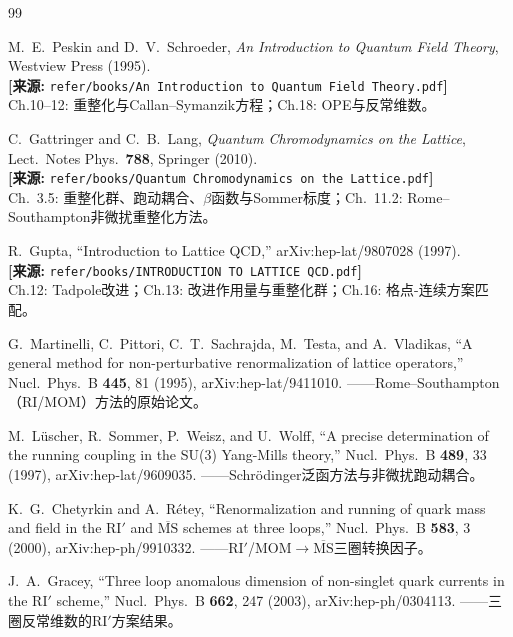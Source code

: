 \documentclass[12pt,a4paper]{ctexart}
\theoremstyle{definition}
\begin{document}
\begin{thebibliography}{99}

M.~E.~Peskin and D.~V.~Schroeder, \textit{An Introduction to Quantum Field Theory}, Westview Press (1995).
\\\textbf{[来源:} \texttt{refer/books/An Introduction to Quantum Field Theory.pdf}\textbf{]}
\\Ch.10--12: 重整化与Callan--Symanzik方程；Ch.18: OPE与反常维数。

C.~Gattringer and C.~B.~Lang, \textit{Quantum Chromodynamics on the Lattice}, Lect.\ Notes Phys.\ \textbf{788}, Springer (2010).
\\\textbf{[来源:} \texttt{refer/books/Quantum Chromodynamics on the Lattice.pdf}\textbf{]}
\\Ch.~3.5: 重整化群、跑动耦合、$\beta$函数与Sommer标度；Ch.~11.2: Rome--Southampton非微扰重整化方法。

R.~Gupta, ``Introduction to Lattice QCD,'' arXiv:hep-lat/9807028 (1997).
\\\textbf{[来源:} \texttt{refer/books/INTRODUCTION TO LATTICE QCD.pdf}\textbf{]}
\\Ch.12: Tadpole改进；Ch.13: 改进作用量与重整化群；Ch.16: 格点-连续方案匹配。

G.~Martinelli, C.~Pittori, C.~T.~Sachrajda, M.~Testa, and A.~Vladikas,
``A general method for non-perturbative renormalization of lattice operators,''
Nucl.\ Phys.\ B \textbf{445}, 81 (1995), arXiv:hep-lat/9411010.
——Rome--Southampton（RI/MOM）方法的原始论文。

M.~L\"uscher, R.~Sommer, P.~Weisz, and U.~Wolff,
``A precise determination of the running coupling in the SU(3) Yang-Mills theory,''
Nucl.\ Phys.\ B \textbf{489}, 33 (1997), arXiv:hep-lat/9609035.
——Schr\"odinger泛函方法与非微扰跑动耦合。

K.~G.~Chetyrkin and A.~R\'etey,
``Renormalization and running of quark mass and field in the RI$'$ and $\overline{\text{MS}}$ schemes at three loops,''
Nucl.\ Phys.\ B \textbf{583}, 3 (2000), arXiv:hep-ph/9910332.
——RI$'$/MOM$\to\overline{\text{MS}}$三圈转换因子。

J.~A.~Gracey,
``Three loop anomalous dimension of non-singlet quark currents in the RI$'$ scheme,''
Nucl.\ Phys.\ B \textbf{662}, 247 (2003), arXiv:hep-ph/0304113.
——三圈反常维数的RI$'$方案结果。


\end{thebibliography}
\end{document}
